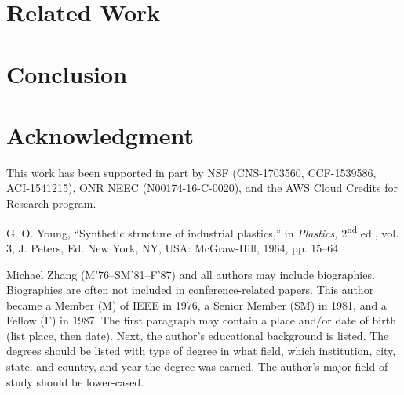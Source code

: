 \documentclass{ieeeaccess}
\begin{document}
\section{Related Work}
\label{sec:relate_work}



\section{Conclusion}
\label{sec:conclusion}


\section*{Acknowledgment}
This work has been supported in part by NSF (CNS-1703560, CCF-1539586,
ACI-1541215), ONR NEEC (N00174-16-C-0020),
and the AWS Cloud Credits for Research program.

\begin{thebibliography}{00}

 G. O. Young, ``Synthetic structure of industrial plastics,'' in \emph{Plastics,} 2\textsuperscript{nd} ed., vol. 3, J. Peters, Ed. New York, NY, USA: McGraw-Hill, 1964, pp. 15--64.
\end{thebibliography}


\begin{IEEEbiography}{Michael Zhang} (M'76--SM'81--F'87) and all authors may include 
biographies. Biographies are often not included in conference-related
papers. This author became a Member (M) of IEEE in 1976, a Senior
Member (SM) in 1981, and a Fellow (F) in 1987. The first paragraph may
contain a place and/or date of birth (list place, then date). Next,
the author's educational background is listed. The degrees should be
listed with type of degree in what field, which institution, city,
state, and country, and year the degree was earned. The author's major
field of study should be lower-cased. 


\end{IEEEbiography}
\end{document}
